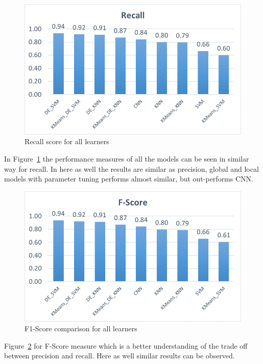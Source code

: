 \documentclass[sigconf]{acmart}
\theoremstyle{break}
\begin{document}
     \begin{figure}
        \centering
        \includegraphics[width=\linewidth]{fig/recall.png}
        \caption{Recall score for all learners}
        \label{fig:Recall}
    \end{figure}
    
    In Figure~\ref{fig:Recall} the performance measures of all the models can be seen in similar way for recall. In here as well the results are similar as precision, global and local models with parameter tuning performs almost similar, but out-performs CNN.
    
    \begin{figure}
        \centering
        \includegraphics[width=\linewidth]{fig/f-score.png}
        \caption{F1-Score comparison for all learners}
        \label{fig:F1-Score}
    \end{figure}
    
    Figure~\ref{fig:F1-Score} for F-Score measure which is a better understanding of the trade off between precision and recall. Here as well similar results can be observed.
    
\end{document}
